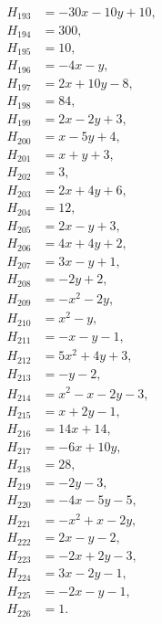 \documentclass[11pt]{article}
\begin{document}
\begin{align*}
H_{193}&=-30x-10y+10,\\
H_{194}&=300,\\
H_{195}&=10,\\
H_{196}&=-4x-y,\\
H_{197}&=2x+10y-8,\\
H_{198}&=84,\\
H_{199}&=2x-2y+3,\\
H_{200}&=x-5y+4,\\
H_{201}&=x+y+3,\\
H_{202}&=3,\\
H_{203}&=2x+4y+6,\\
H_{204}&=12,\\
H_{205}&=2x-y+3,\\
H_{206}&=4x+4y+2,\\
H_{207}&=3x-y+1,\\
H_{208}&=-2y+2,\\
H_{209}&=-x^{2}-2y,\\
H_{210}&=x^{2}-y,\\
H_{211}&=-x-y-1,\\
H_{212}&=5x^{2}+4y+3,\\
H_{213}&=-y-2,\\
H_{214}&=x^{2}-x-2y-3,\\
H_{215}&=x+2y-1,\\
H_{216}&=14x+14,\\
H_{217}&=-6x+10y,\\
H_{218}&=28,\\
H_{219}&=-2y-3,\\
H_{220}&=-4x-5y-5,\\
H_{221}&=-x^{2}+x-2y,\\
H_{222}&=2x-y-2,\\
H_{223}&=-2x+2y-3,\\
H_{224}&=3x-2y-1,\\
H_{225}&=-2x-y-1,\\
H_{226}&=1.
\end{align*}
\end{document}
